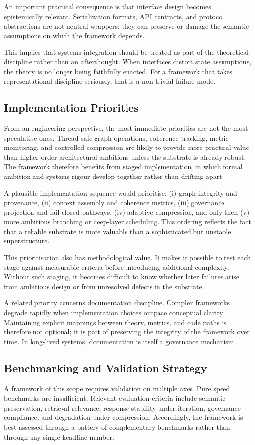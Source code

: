\documentclass[12pt]{article}
\begin{document}
An important practical consequence is that interface design becomes epistemically relevant. Serialization formats, API contracts, and protocol abstractions are not neutral wrappers; they can preserve or damage the semantic assumptions on which the framework depends.

This implies that systems integration should be treated as part of the theoretical discipline rather than an afterthought. When interfaces distort state assumptions, the theory is no longer being faithfully enacted. For a framework that takes representational discipline seriously, that is a non-trivial failure mode.

\subsection{Implementation Priorities}
From an engineering perspective, the most immediate priorities are not the most speculative ones. Thread-safe graph operations, coherence tracking, metric monitoring, and controlled compression are likely to provide more practical value than higher-order architectural ambitions unless the substrate is already robust. The framework therefore benefits from staged implementation, in which formal ambition and systems rigour develop together rather than drifting apart.

A plausible implementation sequence would prioritise: (i) graph integrity and provenance, (ii) context assembly and coherence metrics, (iii) governance projection and fail-closed pathways, (iv) adaptive compression, and only then (v) more ambitious branching or deep-layer scheduling. This ordering reflects the fact that a reliable substrate is more valuable than a sophisticated but unstable superstructure.

This prioritisation also has methodological value. It makes it possible to test each stage against measurable criteria before introducing additional complexity. Without such staging, it becomes difficult to know whether later failures arise from ambitious design or from unresolved defects in the substrate.

A related priority concerns documentation discipline. Complex frameworks degrade rapidly when implementation choices outpace conceptual clarity. Maintaining explicit mappings between theory, metrics, and code paths is therefore not optional; it is part of preserving the integrity of the framework over time. In long-lived systems, documentation is itself a governance mechanism.

\subsection{Benchmarking and Validation Strategy}
A framework of this scope requires validation on multiple axes. Pure speed benchmarks are insufficient. Relevant evaluation criteria include semantic preservation, retrieval relevance, response stability under iteration, governance compliance, and degradation under compression. Accordingly, the framework is best assessed through a battery of complementary benchmarks rather than through any single headline number.
\end{document}
